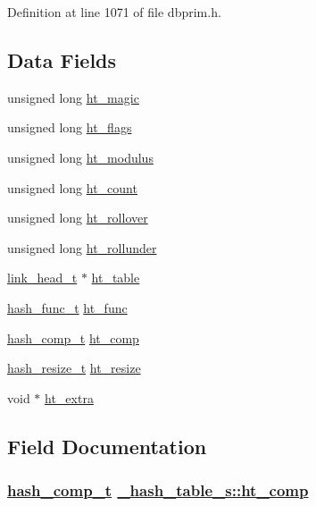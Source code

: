 Definition at line 1071 of file dbprim.h.\subsection*{Data Fields}
\begin{CompactItemize}
\item 
unsigned long \hyperlink{struct__hash__table__s_o0}{ht\_\-magic}
\item 
unsigned long \hyperlink{struct__hash__table__s_o1}{ht\_\-flags}
\item 
unsigned long \hyperlink{struct__hash__table__s_o2}{ht\_\-modulus}
\item 
unsigned long \hyperlink{struct__hash__table__s_o3}{ht\_\-count}
\item 
unsigned long \hyperlink{struct__hash__table__s_o4}{ht\_\-rollover}
\item 
unsigned long \hyperlink{struct__hash__table__s_o5}{ht\_\-rollunder}
\item 
\hyperlink{struct__link__head__s}{link\_\-head\_\-t} $\ast$ \hyperlink{struct__hash__table__s_o6}{ht\_\-table}
\item 
\hyperlink{group__dbprim__hash_ga4}{hash\_\-func\_\-t} \hyperlink{struct__hash__table__s_o7}{ht\_\-func}
\item 
\hyperlink{group__dbprim__hash_ga5}{hash\_\-comp\_\-t} \hyperlink{struct__hash__table__s_o8}{ht\_\-comp}
\item 
\hyperlink{group__dbprim__hash_ga6}{hash\_\-resize\_\-t} \hyperlink{struct__hash__table__s_o9}{ht\_\-resize}
\item 
void $\ast$ \hyperlink{struct__hash__table__s_o10}{ht\_\-extra}
\end{CompactItemize}


\subsection{Field Documentation}
\hypertarget{struct__hash__table__s_o8}{
\subsubsection[ht\_\-comp]{\setlength{\rightskip}{0pt plus 5cm}\hyperlink{group__dbprim__hash_ga5}{hash\_\-comp\_\-t} \hyperlink{struct__hash__table__s_o8}{\_\-hash\_\-table\_\-s::ht\_\-comp}}}
\label{struct__hash__table__s_o8}


